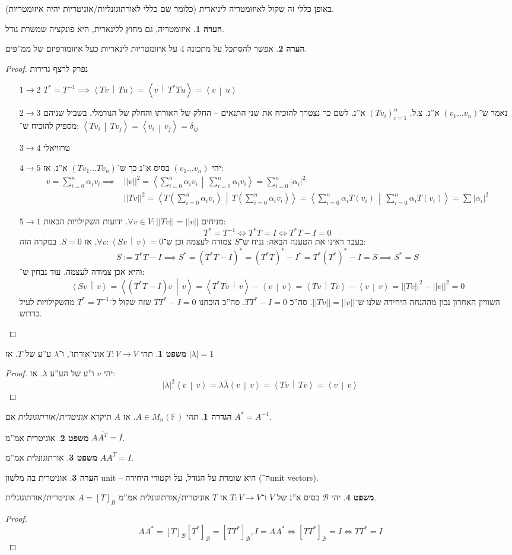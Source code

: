 \documentclass[a4paper]{article}
\newcommand\bc    {\mathcal{B}}
\newcommand\ra    {\rangle}
\newcommand\la    {\langle}
\newcommand\ol    {\overline}
\newcommand\sumni     {\sum_{i = 0}^{n}}
\newcommand\F         {\mathbb{F}}
\newcommand\co        {\colon}
\newcommand\norm[1]   {\left \vert \left \vert #1 \right \vert \right \vert}
\newcommand\mut [2]   {\left \la #1 \,\middle\vert\, #2 \right \ra}
\newcommand\ag        {\alpha}
\newcommand\dg        {\delta}
\renewcommand\lg      {\lambda}
\newcommand\op    {^{-1}}
\newcommand\cl [1]    {\left ( #1 \right )}
\theoremstyle{definition}
\newtheorem{Theorem}{משפט}
\newtheorem{definition}{הגדרה}
\newtheorem{Remark}{הערה}
\newcommand\theo  [1] {\begin{Theorem}#1\end{Theorem}}
\newcommand\defi  [1] {\begin{definition}#1\end{definition}}
\newcommand\rmark [1] {\begin{Remark}#1\end{Remark}}
\begin{document}
	באופן כללי זה שקול לאיזומטריה ליניארית (כלומר שם כללי לאורתוגונליות/אוניטריות יהיה איזומטריות). 
	
	\rmark{איזומטריה, גם מחוץ ללינארית, היא פונקציה שמשרת גודל. }
	
	\rmark{אפשר להסתכל על מתכונה 4 על איזומטריות לינאריות כעל איזומורפיזם של ממ''פים. }
	
	\begin{proof}נפרק לרצף גרירות
		\begin{enumerate}
			\item[$1 \to 2$] \hfil $T^* = T\op \implies \mut{Tv}{Tu} = \mut{v}{T^*Tu} = \mut{v}{u}$
			\item[$2 \to 3$] נאמר ש־$(v_1 \dots v_n)$ א''נ. צ.ל. $(Tv_i)_{i = 1}^{n}$ א''נ. לשם כך נצטרך להוכיח את שני התנאים – החלק של האורתו והחלק של הנורמלי. בשביל שניהם מספיק להוכיח ש־: 
			$\mut{Tv_i}{Tv_j} = \mut{v_i}{v_j}  = \dg_{ij}$
			\item[$3 \to 4$]טרוויאלי
			\item[$4 \to 5$]יהי $(v_1 \dots v_n)$ בסיס א''נ כך ש־$(Tv_1 \dots Tv_n)$ א''נ. אז: 
			\begin{align*}
				v = \sumni \ag_i v_i \implies &\norm{v}^2 = \mut{\sumni \ag_i v_i}{\sumni \ag_i v_i} = \sumni |\ag_i|^2 \\
				&\norm{Tv}^2 = \mut{T\cl{\sumni \ag_i v_i}}{T\cl{\sumni \ag_i v_i}} = \mut{\sumni \ag_i T(v_i)}{\sumni \ag_i T(v_i)} = \sum |\ag_i|^2
			\end{align*}
			\item[$5 \to 1$]מניחים $\forall v \in V \co \norm{Tv} = \norm{v}$. ידועות השקילויות הבאות: 
			\[ T^* = T\op \iff T^*T = I \iff T^*T - I = 0 \]
			בעבר ראינו את הטענה הבאה: נניח ש־$S$ צמודה לעצמה וכן ש־$\forall v \co \mut{Sv}{v} = 0$, אז $S = 0$. במקרה הזה: 
			\[ S := T^*T - I \implies S^* = (T^*T - I)^* = (T^*T)^* - I^* = T^*(T^*)^* - I =S \implies S^* = S \]
			והיא אכן צמודה לעצמה. עוד נבחין ש־: 
			\[ \mut{Sv}{v} = \mut{(T^* T - I)v}{v} =\mut{T^*Tv}{v} - \mut{v}{v} = \mut{Tv}{Tv} - \mut{v}{v} = \norm{Tv}^2 - \norm{v}^2 = 0 \]
			השוויון האחרון נכון מההנחה היחידה שלנו ש־$\norm{Tv} = \norm{v}$. סה''כ $TT^* - I = 0$. סה''כ הוכחנו $TT^* - I = 0$ שזה שקול ל־$T^* = T\op$ מהשקילויות לעיל כדרוש. 
		\end{enumerate}
	\end{proof}
	
	\theo{תהי $T \co V \to V$ אוני'אורתו', ו־$\lg$ ע''ע של $T$. אז $|\lg| = 1$} \begin{proof}
		יהי $v$ ו''ע של הע''ע $\lg$. אז: 
		\[ |\lg|^2 \mut{v}{v} = \lg\bar\lg \mut{v}{v} = \mut{Tv}{Tv} = \mut{v}{v} \]
	\end{proof}
	\defi{תהי $A \in M_n(\F)$. אז $A$ תיקרא \textit{אוניטרית}/\textit{אורתוגונלית} אם $A^* = A\op$. }
	\theo{אוניטרית אמ''מ $A\ol{A^T} = I$. }
	\theo{אורתוגונלית אמ''מ $AA^T = I$. }
	\rmark{אוניטרית בה מלשון unit – היא שומרת על הגודל, על וקטורי היחידה (ה־unit vectors). }
	\theo{יהי $\bc$ בסיס א''נ של $V$ ו־$T \co V \to V$ אז $T$ אוניטרית/אורתוגונלית אמ''מ $A = [T]_B$ אוניטרית/אורתוגונלית. }
	\begin{proof}
		\[ AA^* = [T]_\bc[T^*]_\bc = [TT^*]_\bc, I = AA^* \iff [TT^*]_\bc = I \iff TT^* = I \]
	\end{proof}
	
\end{document}
